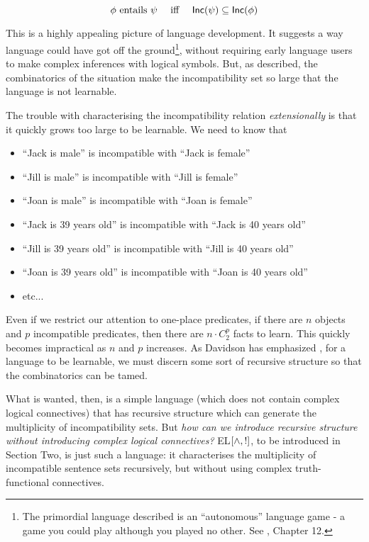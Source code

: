 \[
   \phi \mbox{ entails } \psi \quad \mbox{ iff }\quad \mathsf{Inc}(\psi) \subseteq \mathsf{Inc}(\phi)
\]

\NI This is a highly appealing picture of language development.  It
suggests a way language could have got off the ground\footnote{The
  primordial language described is an ``autonomous'' language game - a
  game you could play although you played no other. See
  \cite{brandom3}, Chapter 12.}, without requiring early language
users to make complex inferences with logical symbols.  But, as
described, the combinatorics of the situation make the incompatibility
set so large that the language is not learnable.

The trouble with characterising the incompatibility relation
\emph{extensionally} is that it quickly grows too large to be
learnable. We need to know that

\begin{itemize}

\item ``Jack is male'' is incompatible with ``Jack is female''
\item ``Jill is male'' is incompatible with ``Jill is female''
\item ``Joan is male'' is incompatible with ``Joan is female''
\item ``Jack is 39 years old'' is incompatible with ``Jack is 40 years old''
\item ``Jill is 39 years old'' is incompatible with ``Jill is 40 years old''
\item ``Joan is 39 years old'' is incompatible with ``Joan is 40 years old''
\item etc...

\end{itemize}

\NI Even if we restrict our attention to one-place predicates, if
there are $n$ objects and $p$ incompatible predicates, then there are
$n\cdot C^p_2$ facts to learn.  This quickly becomes impractical as $n$ and
$p$ increases.  As Davidson has emphasized \cite{davidson}, for a
language to be learnable, we must discern some sort of recursive
structure so that the combinatorics can be tamed.

What is wanted, then, is a simple language (which does not contain
complex logical connectives) that has recursive structure which can
generate the multiplicity of incompatibility sets.  But \emph{how can
  we introduce recursive structure without introducing complex logical
  connectives?} EL$[\land, !]$, to be introduced in Section Two, is
just such a language: it characterises the multiplicity of
incompatible sentence sets recursively, but without using complex
truth-functional connectives.


